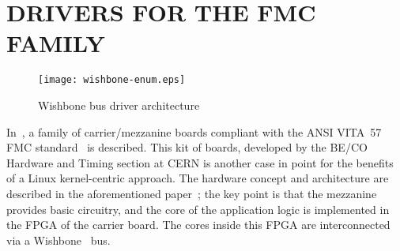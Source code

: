 \documentclass{JAC2003}
\begin{document}
\section{DRIVERS FOR THE FMC FAMILY}

\begin{figure}[t]
   \centering
   \texttt{[image: wishbone-enum.eps]}
   \caption{Wishbone bus driver architecture}
   \label{wishbone-enum}
\end{figure}


In~\cite{fpga-fmc}, a family of carrier/mezzanine boards compliant
with the ANSI VITA~57 FMC standard~\cite{vita-fmc} is described. This kit of boards,
developed by the BE/CO Hardware and Timing section at CERN is
another case in point for the benefits of a Linux kernel-centric
approach. The hardware concept and architecture are described
in the aforementioned paper~\cite{fpga-fmc}; the key point is that the
mezzanine provides basic circuitry, and the core of the application
logic is implemented in the FPGA of the carrier board. The cores inside
this FPGA are interconnected via a Wishbone~\cite{wishbone-spec} bus.
\end{document}
